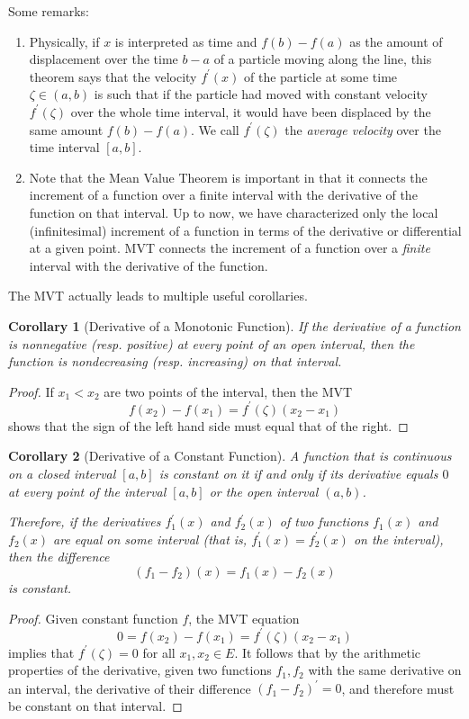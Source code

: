 \documentclass{article}
\newtheorem{corollary}{Corollary}[theorem]
\theoremstyle{remark}
\theoremstyle{definition}
\begin{document}
Some remarks: 
\begin{enumerate}
    \item Physically, if $x$ is interpreted as time and $f(b) - f(a)$ as the amount of displacement over the time $b-a$ of a particle moving along the line, this theorem says that the velocity $f^\prime (x)$ of the particle at some time $\zeta \in (a, b)$ is such that if the particle had moved with constant velocity $f^\prime (\zeta)$ over the whole time interval, it would have been displaced by the same amount $f(b) - f(a)$. We call $f^\prime (\zeta)$ the \textit{average velocity} over the time interval $[a, b]$. 
    \item Note that the Mean Value Theorem is important in that it connects the increment of a function over a finite interval with the derivative of the function on that interval. Up to now, we have characterized only the local (infinitesimal) increment of a function in terms of the derivative or differential at a given point. MVT connects the increment of a function over a \textit{finite} interval with the derivative of the function. 
\end{enumerate}

The MVT actually leads to multiple useful corollaries. 

\begin{corollary}[Derivative of a Monotonic Function]
If the derivative of a function is nonnegative (resp. positive) at every point of an open interval, then the function is nondecreasing (resp. increasing) on that interval. 
\end{corollary}
\begin{proof}
If $x_1 < x_2$ are two points of the interval, then the MVT
\[f(x_2) - f(x_1) = f^\prime (\zeta) (x_2 - x_1)\]
shows that the sign of the left hand side must equal that of the right. 
\end{proof}

\begin{corollary}[Derivative of a Constant Function]
A function that is continuous on a closed interval $[a,b]$ is constant on it if and only if its derivative equals $0$ at every point of the interval $[a,b]$ or the open interval $(a, b)$. 

Therefore, if the derivatives $f_1^\prime (x)$ and $f_2^\prime (x)$ of two functions $f_1 (x)$ and $f_2 (x)$ are equal on some interval (that is, $f_1^\prime (x) = f_2^\prime (x)$ on the interval), then the difference
\[(f_1 - f_2) (x) = f_1 (x) - f_2 (x)\]
is constant. 
\end{corollary}
\begin{proof}
Given constant function $f$, the MVT equation 
\[0 = f(x_2) - f(x_1) = f^\prime (\zeta) (x_2 - x_1)\]
implies that $f^\prime (\zeta) = 0$ for all $x_1, x_2 \in E$. It follows that by the arithmetic properties of the derivative, given two functions $f_1, f_2$ with the same derivative on an interval, the derivative of their difference $(f_1 - f_2)^\prime = 0$, and therefore must be constant on that interval. 
\end{proof}
\end{document}
